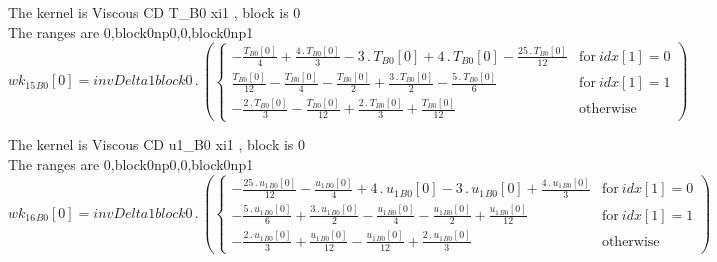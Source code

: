 \documentclass{article}
\begin{document}
\noindent The kernel is Viscous CD T_B0 xi1 , block is 0\\\noindent The ranges are 0,block0np0,0,block0np1\\\begin{dmath}{wk_{15}{_{B0}}}[{0}] = invDelta1block0 \,.\, \left(\begin{cases} - \frac{{T{_{B0}}}[{0}]}{4} + \frac{4 \,.\, {T{_{B0}}}[{0}]}{3} - 3 \,.\, {T{_{B0}}}[{0}] + 4 \,.\, {T{_{B0}}}[{0}] - \frac{25 \,.\, {T{_{B0}}}[{0}]}{12} & \text{for}\: 
{idx}[{1}] = 0 \\\frac{{T{_{B0}}}[{0}]}{12} - \frac{{T{_{B0}}}[{0}]}{4} - \frac{{T{_{B0}}}[{0}]}{2} + \frac{3 \,.\, {T{_{B0}}}[{0}]}{2} - \frac{5 \,.\, {T{_{B0}}}[{0}]}{6} & \text{for}\: {idx}[{1}] = 1 \\- \frac{2 \,.\, {T{_{B0}}}[{0}]}{3} - 
\frac{{T{_{B0}}}[{0}]}{12} + \frac{2 \,.\, {T{_{B0}}}[{0}]}{3} + \frac{{T{_{B0}}}[{0}]}{12} & \text{otherwise} \end{cases}\right)\end{dmath}

\noindent The kernel is Viscous CD u1_B0 xi1 , block is 0\\\noindent The ranges are 0,block0np0,0,block0np1\\\begin{dmath}{wk_{16}{_{B0}}}[{0}] = invDelta1block0 \,.\, \left(\begin{cases} - \frac{25 \,.\, {u_{1}{_{B0}}}[{0}]}{12} - \frac{{u_{1}{_{B0}}}[{0}]}{4} + 4 \,.\, {u_{1}{_{B0}}}[{0}] - 3 \,.\, {u_{1}{_{B0}}}[{0}] + \frac{4 \,.\, 
{u_{1}{_{B0}}}[{0}]}{3} & \text{for}\: {idx}[{1}] = 0 \\- \frac{5 \,.\, {u_{1}{_{B0}}}[{0}]}{6} + \frac{3 \,.\, {u_{1}{_{B0}}}[{0}]}{2} - \frac{{u_{1}{_{B0}}}[{0}]}{4} - \frac{{u_{1}{_{B0}}}[{0}]}{2} + \frac{{u_{1}{_{B0}}}[{0}]}{12} & \text{for}\: 
{idx}[{1}] = 1 \\- \frac{2 \,.\, {u_{1}{_{B0}}}[{0}]}{3} + \frac{{u_{1}{_{B0}}}[{0}]}{12} - \frac{{u_{1}{_{B0}}}[{0}]}{12} + \frac{2 \,.\, {u_{1}{_{B0}}}[{0}]}{3} & \text{otherwise} \end{cases}\right)\end{dmath}
\end{document}
